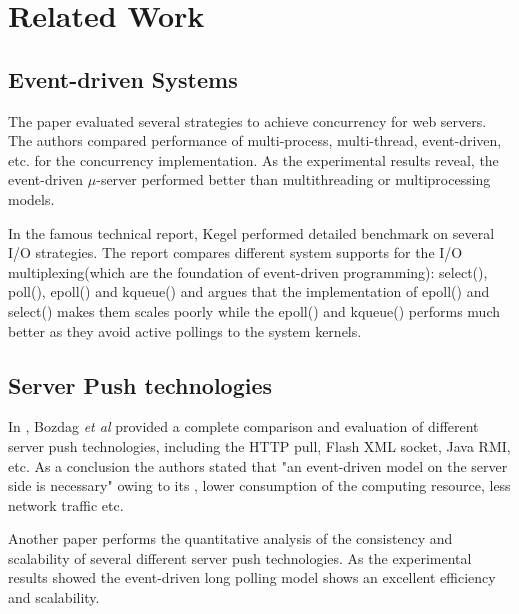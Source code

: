 \section{Related Work\\}

\subsection{Event-driven Systems\\}

The paper\cite{David} evaluated several strategies to achieve concurrency
for web servers. The authors compared performance of multi-process, multi-thread, 
event-driven, etc. for the concurrency implementation. As the experimental 
results reveal, the event-driven $\mu$-server performed better than multithreading
or multiprocessing models.
    
In the famous technical report\cite{C10K}, Kegel performed detailed
benchmark on several I/O strategies. The report compares different 
system supports for the I/O multiplexing(which are the foundation
of event-driven programming): select(), poll(), epoll() and kqueue() 
and argues that the implementation of epoll() and select() makes them
scales poorly while the epoll() and kqueue() performs much better as
they avoid active pollings to the system kernels.

\subsection{Server Push technologies\\}

In \cite{Engin}, Bozdag \emph{et al} provided a complete comparison 
and evaluation of different server push technologies, including the 
HTTP pull, Flash XML socket, Java RMI, etc. As a conclusion the authors 
stated that "an event-driven model on the server side is necessary" 
owing to its , lower consumption of the computing resource, less network
traffic etc.

Another paper \cite{duquennoy09consistency} performs the quantitative 
analysis of the consistency and scalability of several different server
push technologies. As the experimental results showed the event-driven
long polling model shows an excellent efficiency and scalability.

